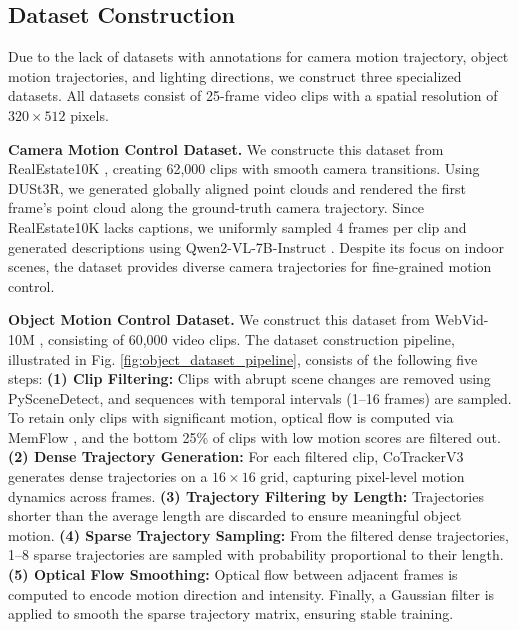 \subsection{Dataset Construction}
\label{subsec:dataset}
Due to the lack of datasets with annotations for camera motion trajectory, object motion trajectories, and lighting directions, we construct three specialized datasets. All datasets consist of 25-frame video clips with a spatial resolution of $320 \times 512$ pixels.

\noindent\textbf{Camera Motion Control Dataset.}
We constructe this dataset from RealEstate10K \cite{zhou2018stereo}, creating 62,000 clips with smooth camera transitions. Using DUSt3R, we generated globally aligned point clouds and rendered the first frame’s point cloud along the ground-truth camera trajectory. Since RealEstate10K lacks captions, we uniformly sampled 4 frames per clip and generated descriptions using Qwen2-VL-7B-Instruct \cite{Qwen2VL}. Despite its focus on indoor scenes, the dataset provides diverse camera trajectories for fine-grained motion control.

\noindent\textbf{Object Motion Control Dataset.}
We construct this dataset from WebVid-10M \cite{bain2021frozen}, consisting of 60,000 video clips. The dataset construction pipeline, illustrated in Fig. \ref{fig:object_dataset_pipeline}, consists of the following five steps:
\textbf{(1) Clip Filtering:}
Clips with abrupt scene changes are removed using PySceneDetect, and sequences with temporal intervals (1–16 frames) are sampled. To retain only clips with significant motion, optical flow is computed via MemFlow \cite{dong2024memflow}, and the bottom 25\% of clips with low motion scores are filtered out.
\textbf{(2) Dense Trajectory Generation:}
For each filtered clip, CoTrackerV3 \cite{karaev24cotracker3} generates dense trajectories on a $16 \times 16$ grid, capturing pixel-level motion dynamics across frames.
\textbf{(3) Trajectory Filtering by Length:}
Trajectories shorter than the average length are discarded to ensure meaningful object motion. 
\textbf{(4) Sparse Trajectory Sampling:}
From the filtered dense trajectories, 1–8 sparse trajectories are sampled with probability proportional to their length.
\textbf{(5) Optical Flow Smoothing:}
Optical flow between adjacent frames is computed to encode motion direction and intensity. Finally, a Gaussian filter is applied to smooth the sparse trajectory matrix, ensuring stable training.


